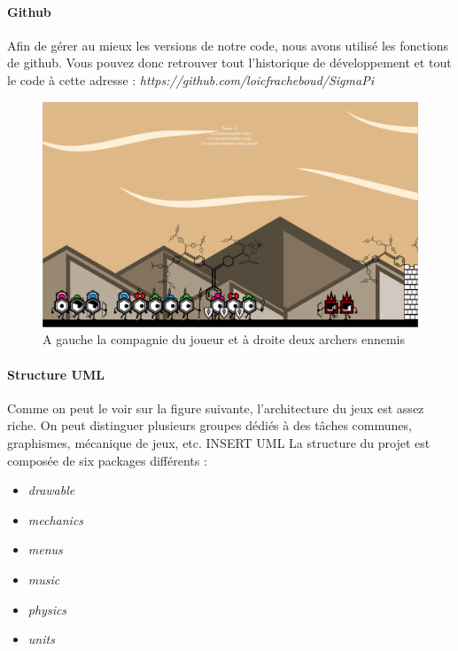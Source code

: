 \documentclass[a4paper,10pt]{article}
\begin{document}
  \paragraph{Github}
  Afin de gérer au mieux les versions de notre code, nous avons utilisé les fonctions de github. Vous pouvez donc retrouver tout l'historique de développement et tout le code à cette adresse : {\itshape https://github.com/loicfracheboud/SigmaPi}
  \begin{figure}[!h]
 \centering
 \vspace{5pt}
 \includegraphics[scale=0.25]{images/menu}
 \caption{A gauche la compagnie du joueur et à droite deux archers ennemis}
 \end{figure}  
  \pagebreak
  
  \paragraph*{Structure UML}
  Comme on peut le voir sur la figure suivante, l'architecture du jeux est assez riche. On peut distinguer plusieurs groupes dédiés à des tâches communes, graphismes, mécanique de jeux, etc. INSERT UML
  \newline La structure du projet est composée de six packages différents :\begin{itemize}
  \item {\itshape drawable}
  \item {\itshape mechanics}
  \item {\itshape menus}
  \item {\itshape music}
  \item {\itshape physics}
  \item {\itshape units}
  \end{itemize}
\end{document}
